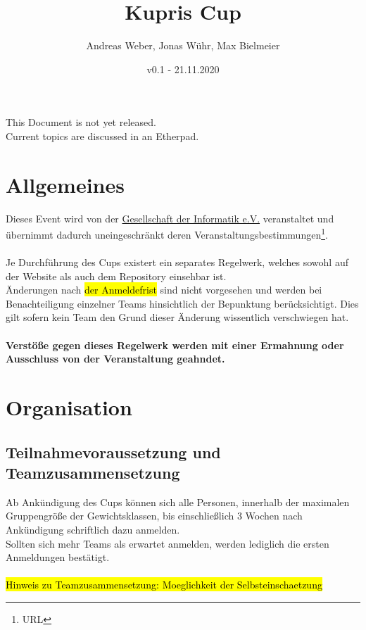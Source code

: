 \documentclass[11pt]{article}
\title{\textbf{Kupris Cup}}
\author{Andreas Weber, Jonas Wühr, Max Bielmeier}
\date{v0.1 - 21.11.2020}
\begin{document}
\pagestyle{plain}

\maketitle
This Document is not yet released.\\
Current topics are discussed in an Etherpad.

\setcounter{tocdepth}{1}
\tableofcontents

\clearpage

\pagestyle{plain}
\section{Allgemeines}
Dieses Event wird von der \href{https://gi.de}{Gesellschaft der Informatik e.V.} veranstaltet und übernimmt dadurch uneingeschränkt deren Veranstaltungsbestimmungen\footnote{URL}.\\	%
\\
Je Durchführung des Cups existert ein separates Regelwerk, welches sowohl auf der Website als auch dem Repository einsehbar ist.\\
Änderungen nach \hl{der Anmeldefrist} sind nicht vorgesehen und werden bei Benachteiligung einzelner Teams hinsichtlich der Bepunktung berücksichtigt. Dies gilt sofern kein Team den Grund dieser Änderung wissentlich verschwiegen hat.\\
\\
\textbf{Verstöße gegen dieses Regelwerk werden mit einer Ermahnung oder Ausschluss von der Veranstaltung geahndet.}

\section{Organisation}
\subsection{Teilnahmevoraussetzung und Teamzusammensetzung}
Ab Ankündigung des Cups können sich alle Personen, innerhalb der maximalen Gruppengröße der Gewichtsklassen, bis einschließlich 3 Wochen nach Ankündigung schriftlich dazu anmelden.\\
Sollten sich mehr Teams als erwartet anmelden, werden lediglich die ersten Anmeldungen bestätigt.\\
\\
\hl{Hinweis zu Teamzusammensetzung: Moeglichkeit der Selbsteinschaetzung }
\end{document}
